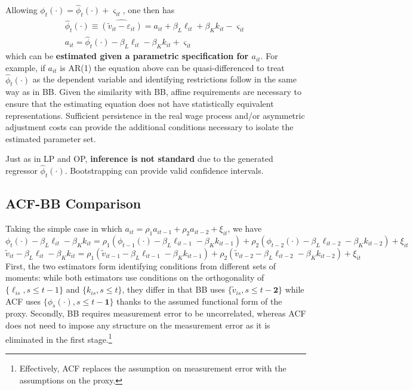 \documentclass[11pt]{article}
\begin{document}
Allowing $\phi_t(\cdot) = \hat{\phi}_t(\cdot) + \varsigma_{it}$, one then has
\begin{equation*}
	\begin{gathered}
		\hat{\phi}_t(\cdot) \equiv \widehat{(\tilde{v}_{it} - \varepsilon_{it})} = a_{it} + \beta_L \ell_{it} + \beta_K k_{it} - \varsigma_{it} \\
		a_{it} = \hat{\phi}_t(\cdot) - \beta_L \ell_{it} - \beta_K k_{it} + \varsigma_{it}
	\end{gathered}
\end{equation*}
which can be \textbf{estimated given a parametric specification for $a_{it}$}.
For example, if $a_{it}$ is AR(1) the equation above can be quasi-differenced to treat $\hat{\phi}_t(\cdot)$ as the dependent variable and identifying restrictions follow in the same way as in BB.
Given the similarity with BB, affine requirements are necessary to ensure that the estimating equation does not have statistically equivalent representations.
Sufficient persistence in the real wage process and/or asymmetric adjustment costs can provide the additional conditions necessary to isolate the estimated parameter set.

Just as in LP and OP, \textbf{inference is not standard} due to the generated regressor $\hat{\phi}_t(\cdot)$. Bootstrapping can provide valid confidence intervals.

\subsection*{ACF-BB Comparison}

Taking the simple case in which $a_{it} = \rho_1 a_{it-1} + \rho_2 a_{it-2} + \xi_{it}$, we have
\begin{equation*}
	\tag{ACF}
\phi_t(\cdot) - \beta_L \ell_{it} - \beta_K k_{it} =  \rho_1 (\phi_{t-1}(\cdot) - \beta_L \ell_{it-1} - \beta_K k_{it-1})+ \rho_2 (\phi_{t-2}(\cdot) - \beta_L \ell_{it-2} - \beta_K k_{it-2}) + \xi_{it}
\end{equation*}
\begin{equation*}
	\tag{BB}
\tilde{v}_{it} - \beta_L \ell_{it} - \beta_K k_{it} =  \rho_1 (\tilde{v}_{it-1} - \beta_L \ell_{it-1} - \beta_K k_{it-1})+ \rho_2 (\tilde{v}_{it-2} - \beta_L \ell_{it-2} - \beta_K k_{it-2}) + \xi_{it}
\end{equation*}
First, the two estimators form identifying conditions from different sets of moments: while both estimators use conditions on the orthogonality of $\{\ell_{is}, s \leq t-1\}$ and $\{k_{is}, s \leq t\}$, they differ in that BB uses $\{\tilde{v}_{is}, s \leq t-\mathbf{2}\}$ while ACF uses $\{\phi_s(\cdot), s \leq t-\mathbf{1}\}$ thanks to the assumed functional form of the proxy.
Secondly, BB requires measurement error to be uncorrelated, whereas ACF does not need to impose any structure on the measurement error as it is eliminated in the first stage.\footnote{Effectively, ACF replaces the assumption on measurement error with the assumptions on the proxy.}
\end{document}
